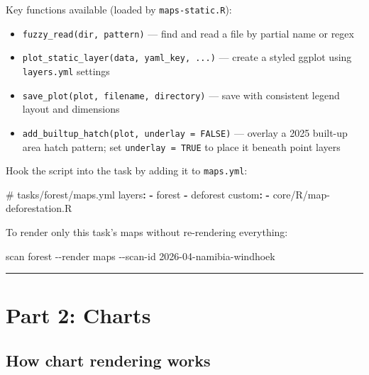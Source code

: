 \documentclass[
  letterpaper,
  DIV=11,
  numbers=noendperiod]{scrreprt}
\newenvironment{Shaded}{\begin{snugshade}}{\end{snugshade}}
\newcommand{\AttributeTok}[1]{\textcolor[rgb]{0.40,0.45,0.13}{#1}}
\newcommand{\CommentTok}[1]{\textcolor[rgb]{0.37,0.37,0.37}{#1}}
\newcommand{\ExtensionTok}[1]{\textcolor[rgb]{0.00,0.23,0.31}{#1}}
\newcommand{\FunctionTok}[1]{\textcolor[rgb]{0.28,0.35,0.67}{#1}}
\newcommand{\KeywordTok}[1]{\textcolor[rgb]{0.00,0.23,0.31}{\textbf{#1}}}
\newcommand{\NormalTok}[1]{\textcolor[rgb]{0.00,0.23,0.31}{#1}}
\providecommand{\tightlist}{%
  \setlength{\itemsep}{0pt}\setlength{\parskip}{0pt}}
\begin{document}
Key functions available (loaded by \texttt{maps-static.R}):

\begin{itemize}
\tightlist
\item
  \texttt{fuzzy\_read(dir,\ pattern)} --- find and read a file by
  partial name or regex
\item
  \texttt{plot\_static\_layer(data,\ yaml\_key,\ ...)} --- create a
  styled ggplot using \texttt{layers.yml} settings
\item
  \texttt{save\_plot(plot,\ filename,\ directory)} --- save with
  consistent legend layout and dimensions
\item
  \texttt{add\_builtup\_hatch(plot,\ underlay\ =\ FALSE)} --- overlay a
  2025 built-up area hatch pattern; set \texttt{underlay\ =\ TRUE} to
  place it beneath point layers
\end{itemize}

Hook the script into the task by adding it to \texttt{maps.yml}:

\begin{Shaded}
\begin{Highlighting}[]
\CommentTok{\# tasks/forest/maps.yml}
\FunctionTok{layers}\KeywordTok{:}
\AttributeTok{  }\KeywordTok{{-}}\AttributeTok{ forest}
\AttributeTok{  }\KeywordTok{{-}}\AttributeTok{ deforest}
\FunctionTok{custom}\KeywordTok{:}
\AttributeTok{  }\KeywordTok{{-}}\AttributeTok{ core/R/map{-}deforestation.R}
\end{Highlighting}
\end{Shaded}

To render only this task's maps without re-rendering everything:

\begin{Shaded}
\begin{Highlighting}[]
\ExtensionTok{scan}\NormalTok{ forest }\AttributeTok{{-}{-}render}\NormalTok{ maps }\AttributeTok{{-}{-}scan{-}id}\NormalTok{ 2026{-}04{-}namibia{-}windhoek}
\end{Highlighting}
\end{Shaded}

\begin{center}\rule{0.5\linewidth}{0.5pt}\end{center}

\section{Part 2: Charts}\label{part-2-charts}

\subsection{How chart rendering works}\label{how-chart-rendering-works}
\end{document}
